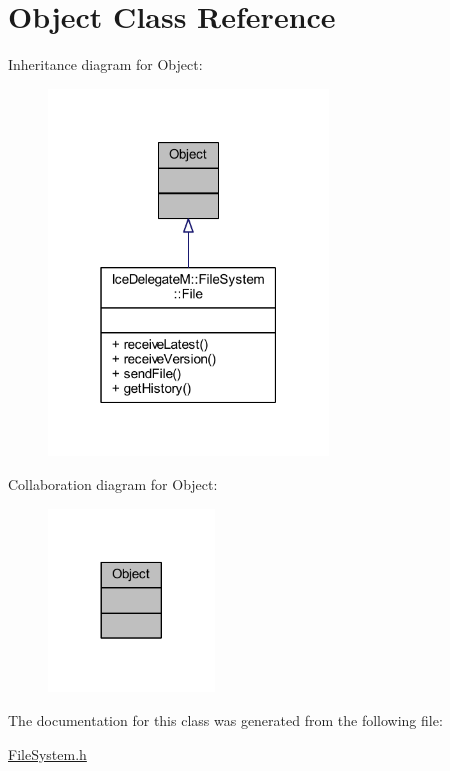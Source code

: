 \hypertarget{class_ice_delegate_m_1_1_ice_1_1_object}{}\section{Object Class Reference}
\label{class_ice_delegate_m_1_1_ice_1_1_object}


Inheritance diagram for Object\+:
\nopagebreak
\begin{figure}[H]
\begin{center}
\leavevmode
\includegraphics[width=211pt]{class_ice_delegate_m_1_1_ice_1_1_object__inherit__graph}
\end{center}
\end{figure}


Collaboration diagram for Object\+:
\nopagebreak
\begin{figure}[H]
\begin{center}
\leavevmode
\includegraphics[width=125pt]{class_ice_delegate_m_1_1_ice_1_1_object__coll__graph}
\end{center}
\end{figure}


The documentation for this class was generated from the following file\+:\begin{DoxyCompactItemize}
\item 
\hyperlink{_file_system_8h}{File\+System.\+h}\end{DoxyCompactItemize}
